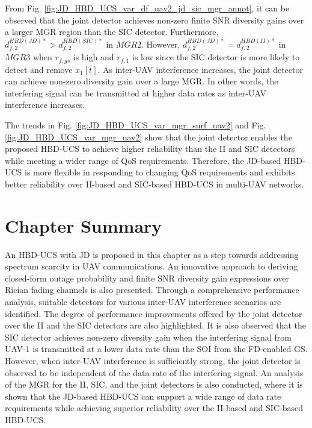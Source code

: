 From Fig. \ref{fig:JD_HBD_UCS_var_df_uav2_jd_sic_mgr_annot}, it can be observed that the joint detector achieves non-zero finite SNR diversity gains over a larger MGR region than the SIC detector. Furthermore, $d_{f,2}^{HBD(JD)*} > d_{f,2}^{HBD(SIC)*}$ in $MGR2$. However, $d_{f,2}^{HBD(JD)*} = d_{f,2}^{HBD(II)*}$ in $MGR3$ when $r_{f,gs}$ is high and $r_{f,1}$ is low since the SIC detector is more likely to detect and remove $x_{1}[t]$. As inter-UAV interference increases, the joint detector can achieve non-zero diversity gain over a large MGR. In other words, the interfering signal can be transmitted at higher data rates as inter-UAV interference increases. 

The trends in Fig. \ref{fig:JD_HBD_UCS_var_mgr_surf_uav2} and Fig. \ref{fig:JD_HBD_UCS_var_mgr_uav2} show that the joint detector enables the proposed HBD-UCS to achieve higher reliability than the II and SIC detectors while meeting a wider range of QoS requirements. Therefore, the JD-based HBD-UCS is more flexible in responding to changing QoS requirements and exhibits better reliability over II-based and SIC-based HBD-UCS in multi-UAV networks.

\section{Chapter Summary}
An HBD-UCS with JD is proposed in this chapter as a step towards addressing spectrum scarcity in UAV communications. An innovative approach to deriving closed-form outage probability and finite SNR diversity gain expressions over Rician fading channels is also presented. Through a comprehensive performance analysis, suitable detectors for various inter-UAV interference scenarios are identified. The degree of performance improvements offered by the joint detector over the II and the SIC detectors are also highlighted. It is also observed that the SIC detector achieves non-zero diversity gain when the interfering signal from UAV-1 is transmitted at a lower data rate than the SOI from the FD-enabled GS. However, when inter-UAV interference is sufficiently strong, the joint detector is observed to be independent of the data rate of the interfering signal. An analysis of the MGR for the II, SIC, and the joint detectors is also conducted, where it is shown that the JD-based HBD-UCS can support a wide range of data rate requirements while achieving superior reliability over the II-based and SIC-based HBD-UCS. 

